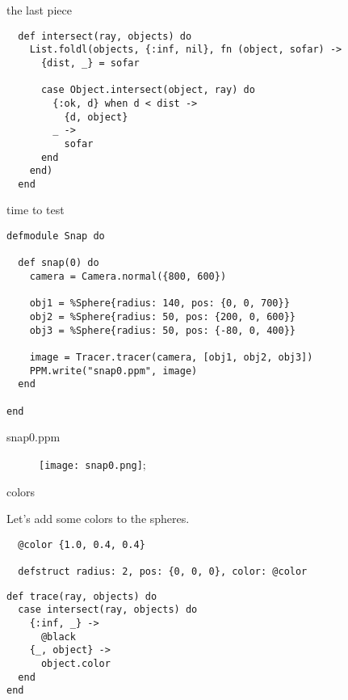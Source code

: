 \begin{frame}[fragile]{the last piece}

\begin{verbatim}
  def intersect(ray, objects) do
    List.foldl(objects, {:inf, nil}, fn (object, sofar) ->
      {dist, _} = sofar

      case Object.intersect(object, ray) do
        {:ok, d} when d < dist ->
          {d, object}
        _ ->
          sofar
      end
    end)
  end
\end{verbatim}

\end{frame}

\begin{frame}[fragile]{time to test}
\begin{verbatim}
defmodule Snap do

  def snap(0) do
    camera = Camera.normal({800, 600})

    obj1 = %Sphere{radius: 140, pos: {0, 0, 700}}
    obj2 = %Sphere{radius: 50, pos: {200, 0, 600}}
    obj3 = %Sphere{radius: 50, pos: {-80, 0, 400}}

    image = Tracer.tracer(camera, [obj1, obj2, obj3])
    PPM.write("snap0.ppm", image)
  end

end
\end{verbatim}
\end{frame}

\begin{frame}{snap0.ppm}

\begin{figure}
\texttt{[image: snap0.png]};
\end{figure}

\end{frame}


\begin{frame}[fragile]{colors}

\pause Let's add some colors to the spheres.

\begin{verbatim}
  @color {1.0, 0.4, 0.4}

  defstruct radius: 2, pos: {0, 0, 0}, color: @color 
\end{verbatim}

\pause
\begin{verbatim}
def trace(ray, objects) do
  case intersect(ray, objects) do
    {:inf, _} ->
      @black
    {_, object} ->
      object.color
  end
end
\end{verbatim}
\end{frame}


